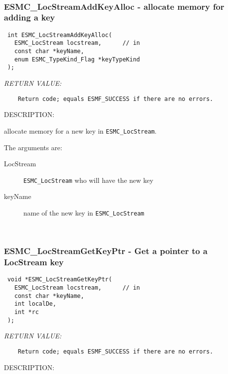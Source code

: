  
\mbox{}\hrulefill\ 
 
\subsubsection [ESMC\_LocStreamAddKeyAlloc] {ESMC\_LocStreamAddKeyAlloc - allocate memory for adding a key}


  
\begin{verbatim} int ESMC_LocStreamAddKeyAlloc(
   ESMC_LocStream locstream,      // in
   const char *keyName,
   enum ESMC_TypeKind_Flag *keyTypeKind
 );
 \end{verbatim}{\em RETURN VALUE:}
\begin{verbatim}    Return code; equals ESMF_SUCCESS if there are no errors.\end{verbatim}
{\sf DESCRIPTION:\\ }


  
    allocate memory for a new key in {\tt ESMC\_LocStream}.
  
    The arguments are:
    \begin{description}
    \item[LocStream]
      {\tt ESMC\_LocStream} who will have the new key
    \item[keyName]
      name of the new key in {\tt ESMC\_LocStream}
    \end{description}
   
 
\mbox{}\hrulefill\ 
 
\subsubsection [ESMC\_LocStreamGetKeyPtr] {ESMC\_LocStreamGetKeyPtr - Get a pointer to a LocStream key}


  
\begin{verbatim} void *ESMC_LocStreamGetKeyPtr(
   ESMC_LocStream locstream,      // in
   const char *keyName,
   int localDe,
   int *rc
 );
 \end{verbatim}{\em RETURN VALUE:}
\begin{verbatim}    Return code; equals ESMF_SUCCESS if there are no errors.\end{verbatim}
{\sf DESCRIPTION:\\ }


